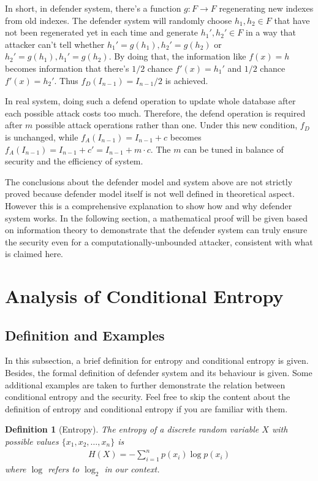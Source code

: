 \documentclass[10pt,a4paper]{article}
\newtheorem{mydef}{Definition}
\begin{document}
		In short, in defender system,
		there's a function $g: F \rightarrow F$ regenerating 
		new indexes from old indexes. The defender system
		will randomly choose $h_1, h_2 \in F$ that have
		not been regenerated yet in each time and generate
		$h_1', h_2' \in F$ in a way that attacker can't tell whether
		$h_1' = g(h_1), h_2' = g(h_2)$ or $h_2' = g(h_1), h_1' = g(h_2)$.
		By doing that, the information like $f(x) = h$ becomes
		information that there's $1/2$ chance $f'(x) = h_1'$ and $1/2$ chance $f'(x) = h_2'$.
		Thus $f_D(I_{n-1}) = I_{n-1}/2$ is achieved.
		
		In real system, doing such a defend operation to update whole
		database after each possible attack costs too much.
		Therefore, the defend operation is required after $m$
		possible attack operations rather than one. Under this
		new condition, $f_D$ is unchanged, while $f_A(I_{n-1}) = I_{n-1}+c$
		becomes $f_A(I_{n-1}) = I_{n-1}+c' = I_{n-1}+m \cdot c$.
		The $m$ can be tuned in balance of security and the
		efficiency of system.
		
		The conclusions about the defender model
		and system above are not strictly
		proved because defender model itself
		is not well defined in theoretical aspect. 
		However this is a comprehensive explanation to show how and why
		defender system works. In the following section, a mathematical proof
		will be given based on information theory to demonstrate that
		the defender system can truly ensure the security even for
		a computationally-unbounded attacker, consistent with what
		is claimed here.
		
\section{Analysis of Conditional Entropy}
	\subsection{Definition and Examples}
		In this subsection, a brief definition for entropy and conditional
		entropy is given. Besides, the formal definition of defender system
		and its behaviour is given.
		Some additional examples are taken to further
		demonstrate the relation between conditional entropy and
		the security. Feel free to skip the content about
		the definition of entropy and conditional entropy if you are familiar
		with them.		
		
		\begin{mydef}[Entropy]\label{def_entropy}
			The entropy of a discrete random variable $X$ with
			possible values $\{x_1, x_2, \ldots, x_n\}$ is
			\begin{align}
				H(X) = -\sum_{i=1}^n p(x_i)\log p(x_i)
			\end{align}
			where $\log$ refers to $\log_2$ in our context.
		\end{mydef}
		
\end{document}

